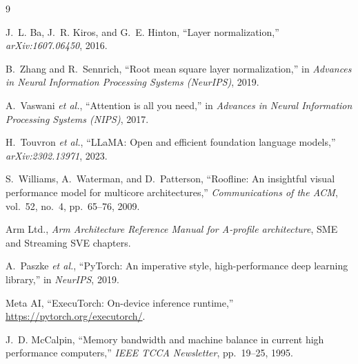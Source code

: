 \documentclass[conference,10pt]{IEEEtran}
\begin{document}
\begin{thebibliography}{9}

J.~L. Ba, J.~R. Kiros, and G.~E. Hinton, ``Layer normalization,''
\emph{arXiv:1607.06450}, 2016.

B.~Zhang and R.~Sennrich, ``Root mean square layer normalization,'' in
\emph{Advances in Neural Information Processing Systems (NeurIPS)}, 2019.

A.~Vaswani \emph{et al.}, ``Attention is all you need,'' in
\emph{Advances in Neural Information Processing Systems (NIPS)}, 2017.

H.~Touvron \emph{et al.}, ``LLaMA: Open and efficient foundation language
models,'' \emph{arXiv:2302.13971}, 2023.

S.~Williams, A.~Waterman, and D.~Patterson, ``Roofline: An insightful visual
performance model for multicore architectures,'' \emph{Communications of the
ACM}, vol.~52, no.~4, pp.~65--76, 2009.

Arm Ltd., \emph{Arm Architecture Reference Manual for A-profile architecture},
SME and Streaming SVE chapters.

A.~Paszke \emph{et al.}, ``PyTorch: An imperative style, high-performance deep
learning library,'' in \emph{NeurIPS}, 2019.

Meta AI, ``ExecuTorch: On-device inference runtime,''
\url{https://pytorch.org/executorch/}.

J.~D. McCalpin, ``Memory bandwidth and machine balance in current high
performance computers,'' \emph{IEEE TCCA Newsletter}, pp.~19--25, 1995.

\end{thebibliography}
\end{document}
